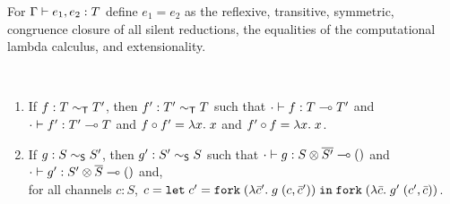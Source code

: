 \begin{definition}
  For $\typing{e_1, e_2} T$ define $e_1 = e_2$
  as the reflexive, transitive, symmetric, congruence closure of all
  silent reductions, the equalities of the computational lambda
  calculus, and extensionality.
\end{definition}

\begin{lemma}[Conversions]~\\[-\baselineskip]
  \begin{enumerate}
    \item If $f : T \eqt T'$, then $f' : T' \eqt T$
      such that $\typing[\CNil]{f}{\TFun T{T'}}$
      and  $\typing[\CNil]{f'}{\TFun {T'}T}$
      and  $f \circ f' = \ELam x x$
      and  $f' \circ f = \ELam x x$.
    \item If $g : S \eqs S'$, then $g' : S' \eqs S$
      such that $\typing[\CNil]{g}{\TFun {\TPair {S} {\TDual{S'}}} \TUnit}$
      and $\typing[\CNil]{g'}{\TFun {\TPair {S'} {\TDual{S}}} \TUnit}$
      and,\\
      for all channels $c : S$,  $c = \ELet{c'}{\EFork{( \ELam {\bar c'} g \; (c, \bar c')) }}{\EFork{( \ELam {\bar c} g' \; (c', \bar c)) }} $.
\end{enumerate}
\end{lemma}
